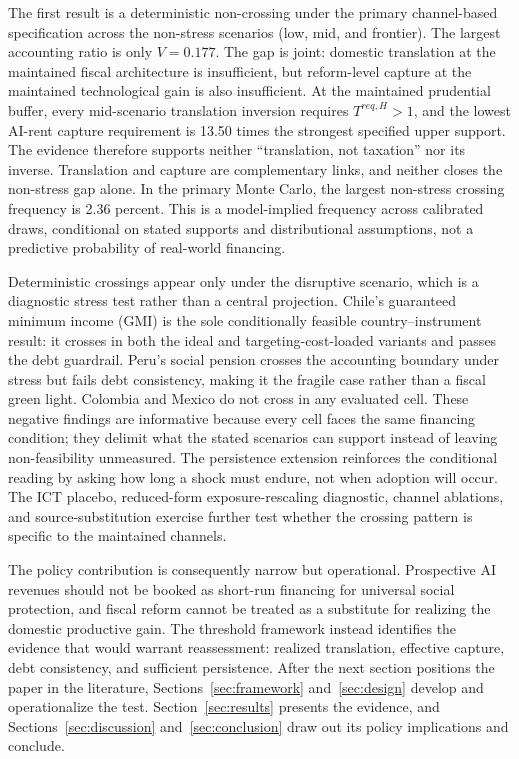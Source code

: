 The first result is a deterministic non-crossing under the primary channel-based specification across the non-stress scenarios (low, mid, and frontier). The largest accounting ratio is only $V=0.177$. The gap is joint: domestic translation at the maintained fiscal architecture is insufficient, but reform-level capture at the maintained technological gain is also insufficient. At the maintained prudential buffer, every mid-scenario translation inversion requires $T^{req,H}>1$, and the lowest AI-rent capture requirement is 13.50 times the strongest specified upper support. The evidence therefore supports neither ``translation, not taxation'' nor its inverse. Translation and capture are complementary links, and neither closes the non-stress gap alone. In the primary Monte Carlo, the largest non-stress crossing frequency is 2.36 percent. This is a model-implied frequency across calibrated draws, conditional on stated supports and distributional assumptions, not a predictive probability of real-world financing.

Deterministic crossings appear only under the disruptive scenario, which is a diagnostic stress test rather than a central projection. Chile's guaranteed minimum income (GMI) is the sole conditionally feasible country--instrument result: it crosses in both the ideal and targeting-cost-loaded variants and passes the debt guardrail. Peru's social pension crosses the accounting boundary under stress but fails debt consistency, making it the fragile case rather than a fiscal green light. Colombia and Mexico do not cross in any evaluated cell. These negative findings are informative because every cell faces the same financing condition; they delimit what the stated scenarios can support instead of leaving non-feasibility unmeasured. The persistence extension reinforces the conditional reading by asking how long a shock must endure, not when adoption will occur. The ICT placebo, reduced-form exposure-rescaling diagnostic, channel ablations, and source-substitution exercise further test whether the crossing pattern is specific to the maintained channels.

The policy contribution is consequently narrow but operational. Prospective AI revenues should not be booked as short-run financing for universal social protection, and fiscal reform cannot be treated as a substitute for realizing the domestic productive gain. The threshold framework instead identifies the evidence that would warrant reassessment: realized translation, effective capture, debt consistency, and sufficient persistence. After the next section positions the paper in the literature, Sections~\ref{sec:framework} and~\ref{sec:design} develop and operationalize the test. Section~\ref{sec:results} presents the evidence, and Sections~\ref{sec:discussion} and~\ref{sec:conclusion} draw out its policy implications and conclude.
